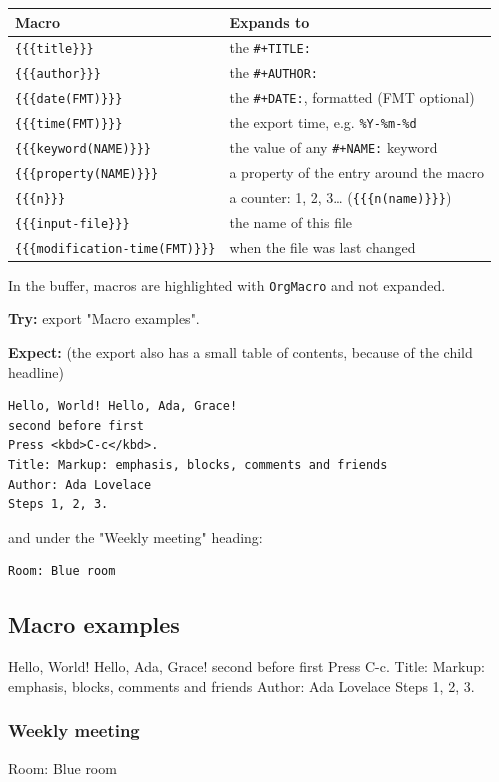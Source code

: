 \begin{center}
\begin{tabular}{ll}
Macro & Expands to\\
\hline
\texttt{\{\{\{title\}\}\}} & the \texttt{\#+TITLE:}\\
\texttt{\{\{\{author\}\}\}} & the \texttt{\#+AUTHOR:}\\
\texttt{\{\{\{date(FMT)\}\}\}} & the \texttt{\#+DATE:}, formatted (FMT optional)\\
\texttt{\{\{\{time(FMT)\}\}\}} & the export time, e.g. \texttt{\%Y-\%m-\%d}\\
\texttt{\{\{\{keyword(NAME)\}\}\}} & the value of any \texttt{\#+NAME:} keyword\\
\texttt{\{\{\{property(NAME)\}\}\}} & a property of the entry around the macro\\
\texttt{\{\{\{n\}\}\}} & a counter: 1, 2, 3\ldots{} (\texttt{\{\{\{n(name)\}\}\}})\\
\texttt{\{\{\{input-file\}\}\}} & the name of this file\\
\texttt{\{\{\{modification-time(FMT)\}\}\}} & when the file was last changed\\
\end{tabular}
\end{center}

In the buffer, macros are highlighted with \texttt{OrgMacro} and not expanded.

\textbf{Try:} export "Macro examples".

\textbf{Expect:} (the export also has a small table of contents, because of the
child headline)
\begin{verbatim}
Hello, World! Hello, Ada, Grace!
second before first
Press <kbd>C-c</kbd>.
Title: Markup: emphasis, blocks, comments and friends
Author: Ada Lovelace
Steps 1, 2, 3.
\end{verbatim}
and under the "Weekly meeting" heading:
\begin{verbatim}
Room: Blue room
\end{verbatim}
\subsection{Macro examples}
\label{sec:orgd57504c}
Hello, World! Hello, Ada, Grace!
second before first
Press C-c.
Title: Markup: emphasis, blocks, comments and friends
Author: Ada Lovelace
Steps 1, 2, 3.
\subsubsection{Weekly meeting}
\label{sec:org0c92d11}
Room: Blue room
